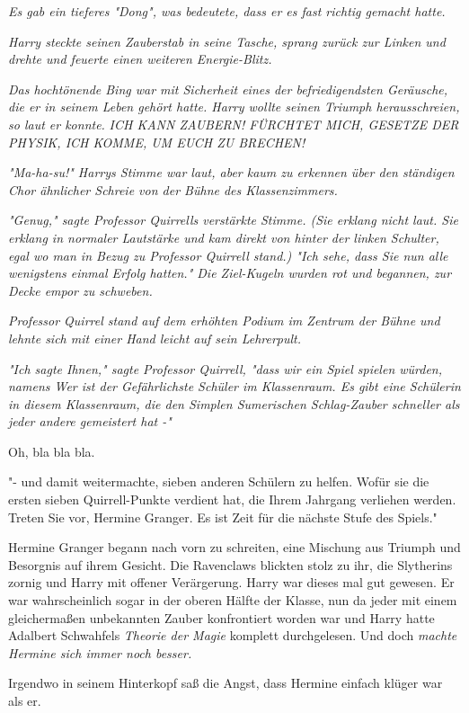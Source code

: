 {\emph{Es gab ein tieferes "Dong", was bedeutete, dass er es fast richtig gemacht hatte.}

\emph{Harry steckte seinen Zauberstab in seine Tasche, sprang zurück zur Linken und drehte und feuerte einen weiteren Energie-Blitz.}

\emph{Das hochtönende Bing war mit Sicherheit eines der befriedigendsten Geräusche, die er in seinem Leben gehört hatte. Harry wollte seinen Triumph herausschreien, so laut er konnte.} \emph{\emph{ICH KANN ZAUBERN! FÜRCHTET MICH, GESETZE DER PHYSIK, ICH KOMME, UM EUCH ZU BRECHEN!}}

\emph{"\emph{Ma-ha-su!}" Harrys Stimme war laut, aber kaum zu erkennen über den ständigen Chor ähnlicher Schreie von der Bühne des Klassenzimmers.}

\emph{"Genug," sagte Professor Quirrells verstärkte Stimme. (Sie erklang nicht laut. Sie erklang in normaler Lautstärke und kam direkt von hinter der linken Schulter, egal wo man in Bezug zu Professor Quirrell stand.) "Ich sehe, dass Sie nun alle wenigstens einmal Erfolg hatten." Die Ziel-Kugeln wurden rot und begannen, zur Decke empor zu schweben.}

\emph{Professor Quirrel stand auf dem erhöhten Podium im Zentrum der Bühne und lehnte sich mit einer Hand leicht auf sein Lehrerpult.}

\emph{"Ich sagte Ihnen," sagte Professor Quirrell, "dass wir ein Spiel spielen würden, namens Wer ist der Gefährlichste Schüler im Klassenraum. Es gibt eine Schülerin in diesem Klassenraum, die den Simplen Sumerischen Schlag-Zauber schneller als jeder andere gemeistert hat -"}

Oh, bla bla bla.

"- und damit weitermachte, sieben anderen Schülern zu helfen. Wofür sie die ersten sieben Quirrell-Punkte verdient hat, die Ihrem Jahrgang verliehen werden. Treten Sie vor, Hermine Granger. Es ist Zeit für die nächste Stufe des Spiels."

Hermine Granger begann nach vorn zu schreiten, eine Mischung aus Triumph und Besorgnis auf ihrem Gesicht. Die Ravenclaws blickten stolz zu ihr, die Slytherins zornig und Harry mit offener Verärgerung. Harry war dieses mal gut gewesen. Er war wahrscheinlich sogar in der oberen Hälfte der Klasse, nun da jeder mit einem gleichermaßen unbekannten Zauber konfrontiert worden war und Harry hatte Adalbert Schwahfels \emph{Theorie der Magie} komplett durchgelesen. Und doch \emph{machte Hermine sich immer noch besser.}

Irgendwo in seinem Hinterkopf saß die Angst, dass Hermine einfach klüger war als er.

}
